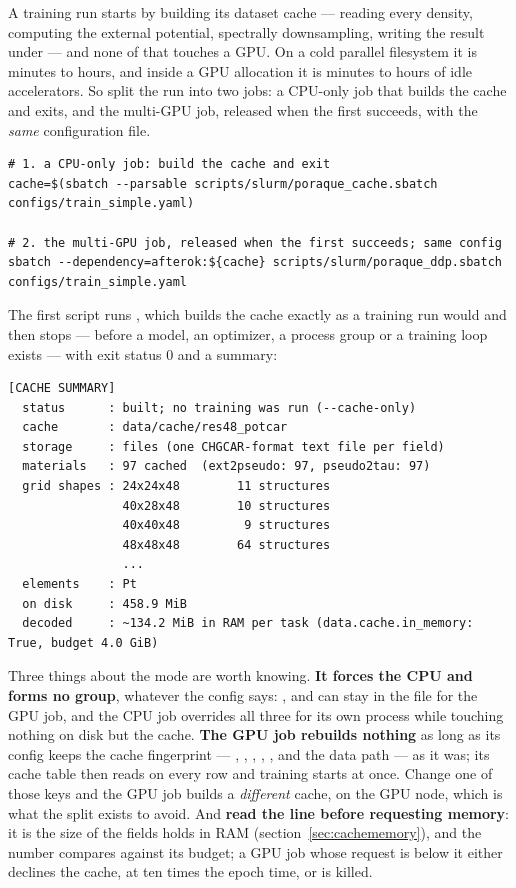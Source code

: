 A training run starts by building its dataset cache --- reading every
density, computing the external potential, spectrally downsampling, writing
the result under  --- and none of that touches a GPU. On a
cold parallel filesystem it is minutes to hours, and inside a GPU allocation
it is minutes to hours of idle accelerators. So split the run into two jobs: a
CPU-only job that builds the cache and exits, and the multi-GPU job, released
when the first succeeds, with the \emph{same} configuration file.

\begin{lstlisting}
# 1. a CPU-only job: build the cache and exit
cache=$(sbatch --parsable scripts/slurm/poraque_cache.sbatch configs/train_simple.yaml)

# 2. the multi-GPU job, released when the first succeeds; same config
sbatch --dependency=afterok:${cache} scripts/slurm/poraque_ddp.sbatch configs/train_simple.yaml
\end{lstlisting}

The first script runs , which builds the cache exactly as a training run would and
then stops --- before a model, an optimizer, a process group or a training
loop exists --- with exit status 0 and a summary:

\begin{lstlisting}
[CACHE SUMMARY]
  status      : built; no training was run (--cache-only)
  cache       : data/cache/res48_potcar
  storage     : files (one CHGCAR-format text file per field)
  materials   : 97 cached  (ext2pseudo: 97, pseudo2tau: 97)
  grid shapes : 24x24x48        11 structures
                40x28x48        10 structures
                40x40x48         9 structures
                48x48x48        64 structures
                ...
  elements    : Pt
  on disk     : 458.9 MiB
  decoded     : ~134.2 MiB in RAM per task (data.cache.in_memory: True, budget 4.0 GiB)
\end{lstlisting}

Three things about the mode are worth knowing. \textbf{It forces the CPU and
forms no group}, whatever the config says: ,
 and  can stay in the file
for the GPU job, and the CPU job overrides all three for its own process while
touching nothing on disk but the cache. \textbf{The GPU job rebuilds nothing}
as long as its config keeps the cache fingerprint --- ,
, ,
, ,  and
the data path --- as it was; its cache table then
reads  on every row and training starts at once. Change one of
those keys and the GPU job builds a \emph{different} cache, on the GPU node,
which is what the split exists to avoid. And \textbf{read the 
line before requesting memory}: it is the size of the fields
 holds in RAM (section~\ref{sec:cachememory}), and
the number  compares against its budget; a GPU job whose request is
below it either declines the cache, at ten times the epoch time, or is killed.

